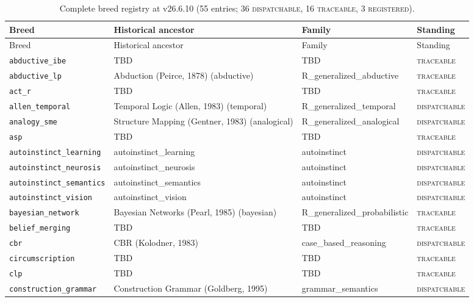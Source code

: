 \documentclass[11pt,oneside]{report}
\newcommand{\projver}{v26.6.10}
\begin{document}
\begin{small}
\begin{longtable}{p{3.4cm}p{5.6cm}p{3.4cm}l}
\caption{Complete breed registry at \projver{} (55 entries; 36
\textsc{dispatchable}, 16 \textsc{traceable}, 3 \textsc{registered}).}
\label{tab:roster}\\
\toprule
Breed & Historical ancestor & Family & Standing \\
\midrule
\endfirsthead
\toprule
Breed & Historical ancestor & Family & Standing \\
\midrule
\endhead
\bottomrule
\endfoot
\texttt{abductive\_ibe} & TBD & TBD & \textsc{traceable} \\
\texttt{abductive\_lp} & Abduction (Peirce, 1878) (abductive) & R\_generalized\_abductive & \textsc{traceable} \\
\texttt{act\_r} & TBD & TBD & \textsc{traceable} \\
\texttt{allen\_temporal} & Temporal Logic (Allen, 1983) (temporal) & R\_generalized\_temporal & \textsc{dispatchable} \\
\texttt{analogy\_sme} & Structure Mapping (Gentner, 1983) (analogical) & R\_generalized\_analogical & \textsc{dispatchable} \\
\texttt{asp} & TBD & TBD & \textsc{traceable} \\
\texttt{autoinstinct\_learning} & autoinstinct\_learning & autoinstinct & \textsc{dispatchable} \\
\texttt{autoinstinct\_neurosis} & autoinstinct\_neurosis & autoinstinct & \textsc{dispatchable} \\
\texttt{autoinstinct\_semantics} & autoinstinct\_semantics & autoinstinct & \textsc{dispatchable} \\
\texttt{autoinstinct\_vision} & autoinstinct\_vision & autoinstinct & \textsc{dispatchable} \\
\texttt{bayesian\_network} & Bayesian Networks (Pearl, 1985) (bayesian) & R\_generalized\_probabilistic & \textsc{traceable} \\
\texttt{belief\_merging} & TBD & TBD & \textsc{traceable} \\
\texttt{cbr} & CBR (Kolodner, 1983) & case\_based\_reasoning & \textsc{dispatchable} \\
\texttt{circumscription} & TBD & TBD & \textsc{traceable} \\
\texttt{clp} & TBD & TBD & \textsc{traceable} \\
\texttt{construction\_grammar} & Construction Grammar (Goldberg, 1995) & grammar\_semantics & \textsc{dispatchable} \\

\end{longtable}
\end{small}
\end{document}
